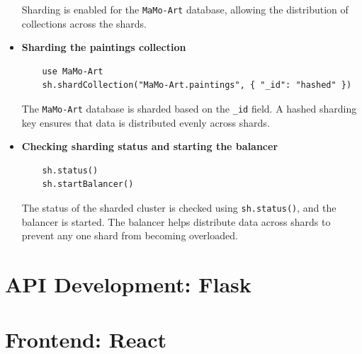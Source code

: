 \documentclass[a4paper,12pt]{article}
\begin{document}
\begin{itemize}
    Sharding is enabled for the \texttt{MaMo-Art} database, allowing the distribution of collections across the shards.

    \item \textbf{Sharding the paintings collection}

    \begin{lstlisting}
    use MaMo-Art
    sh.shardCollection("MaMo-Art.paintings", { "_id": "hashed" })
    \end{lstlisting}

    The \texttt{MaMo-Art} database is sharded based on the \texttt{\_id} field. A hashed sharding key ensures that data is distributed evenly across shards.

    \item \textbf{Checking sharding status and starting the balancer}

    \begin{lstlisting}
    sh.status()
    sh.startBalancer()
    \end{lstlisting}

    The status of the sharded cluster is checked using \texttt{sh.status()}, and the balancer is started. The balancer helps distribute data across shards to prevent any one shard from becoming overloaded.
\end{itemize}

\newpage
\section{API Development: Flask}
\justify

\newpage

\section{Frontend: React}
\justify
\end{document}
